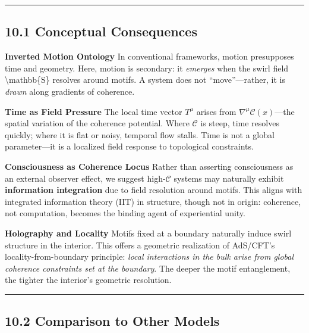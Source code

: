 \documentclass[
  11pt,
]{article}
\begin{document}
\begin{center}\rule{0.5\linewidth}{0.5pt}\end{center}

\subsection{10.1 Conceptual Consequences}\label{conceptual-consequences}

\textbf{Inverted Motion Ontology} In conventional frameworks, motion
presupposes time and geometry. Here, motion is secondary: it
\emph{emerges} when the swirl field \textbackslash mathbb\{S\} resolves
around motifs. A system does not ``move''---rather, it is \emph{drawn}
along gradients of coherence.

\textbf{Time as Field Pressure} The local time vector \(T^\mu\) arises
from \(\nabla^\mu \mathcal{C}(x)\)---the spatial variation of the
coherence potential. Where \(\mathcal{C}\) is steep, time resolves
quickly; where it is flat or noisy, temporal flow stalls. Time is not a
global parameter---it is a localized field response to topological
constraints.

\textbf{Consciousness as Coherence Locus} Rather than asserting
consciousness as an external observer effect, we suggest
high-\(\mathcal{C}\) systems may naturally exhibit \textbf{information
integration} due to field resolution around motifs. This aligns with
integrated information theory (IIT) in structure, though not in origin:
coherence, not computation, becomes the binding agent of experiential
unity.

\textbf{Holography and Locality} Motifs fixed at a boundary naturally
induce swirl structure in the interior. This offers a geometric
realization of AdS/CFT's locality-from-boundary principle: \emph{local
interactions in the bulk arise from global coherence constraints set at
the boundary}. The deeper the motif entanglement, the tighter the
interior's geometric resolution.

\begin{center}\rule{0.5\linewidth}{0.5pt}\end{center}

\subsection{10.2 Comparison to Other
Models}\label{comparison-to-other-models}
\end{document}
